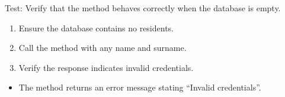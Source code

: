 \documentclass[letterpaper,10pt,english]{sphinxmanual}
\begin{document}

\begin{fulllineitems}
\label{\detokenize{test:test.test_residetnt.test_login_empty_database}}
\pysigstartsignatures
\pysiglinewithargsret
{}
{}
{}
\pysigstopsignatures
\sphinxAtStartPar
Test: Verify that the method behaves correctly when the database is empty.
\begin{description}
\begin{enumerate}
%
\item {} 
\sphinxAtStartPar
Ensure the database contains no residents.

\item {} 
\sphinxAtStartPar
Call the  method with any name and surname.

\item {} 
\sphinxAtStartPar
Verify the response indicates invalid credentials.

\end{enumerate}

\begin{itemize}
\item {} 
\sphinxAtStartPar
The method returns an error message stating “Invalid credentials”.

\end{itemize}

\end{description}

\end{fulllineitems}

\end{document}
